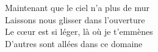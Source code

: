 Maintenant que le ciel n'a plus de mur \\
Laissons nous glisser dans l'ouverture \\

Le cœur est si léger, là où je t'emmènes \\
D'autres sont allées dans ce domaine \\
